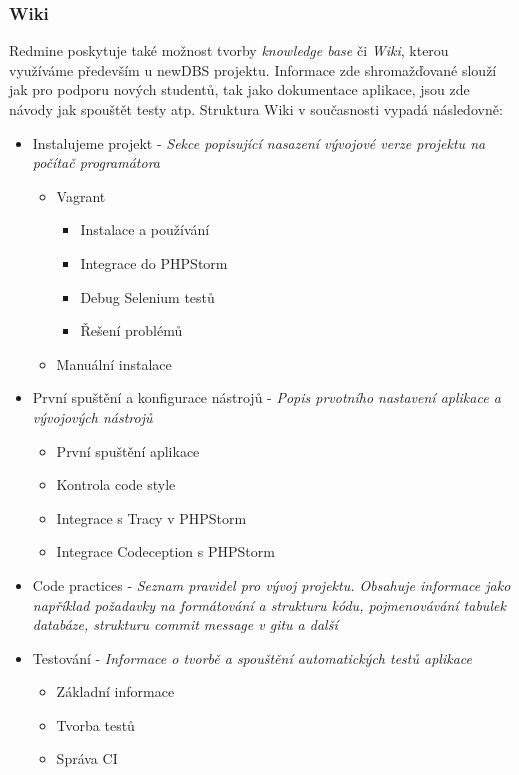 \subsubsection{Wiki}

Redmine poskytuje také možnost tvorby \emph{knowledge base} či \emph{Wiki}, kterou využíváme především u newDBS projektu. Informace zde shromažďované slouží jak pro podporu nových studentů, tak jako dokumentace aplikace, jsou zde návody jak spouštět testy atp. Struktura Wiki v současnosti vypadá následovně:
\begin{itemize}
	\item Instalujeme projekt - \emph{Sekce popisující nasazení vývojové verze projektu na počítač programátora}
	\begin{itemize}
		\item Vagrant
		\begin{itemize}
			\item Instalace a používání
			\item Integrace do PHPStorm
			\item Debug Selenium testů
			\item Řešení problémů
		\end{itemize}
		\item Manuální instalace
	\end{itemize}
	\item První spuštění a konfigurace nástrojů - \emph{Popis prvotního nastavení aplikace a vývojových nástrojů}
	\begin{itemize}
		\item První spuštění aplikace
		\item Kontrola code style
		\item Integrace s Tracy v PHPStorm
		\item Integrace Codeception s PHPStorm
	\end{itemize}
	\item Code practices - \emph{Seznam pravidel pro vývoj projektu. Obsahuje informace jako například požadavky na formátování a strukturu kódu, pojmenovávání tabulek databáze, strukturu commit message v gitu a další}
	\item Testování - \emph{Informace o tvorbě a spouštění automatických testů aplikace}
	\begin{itemize}
		\item Základní informace
		\item Tvorba testů
		\item Správa CI
	\end{itemize}

\end{itemize}
